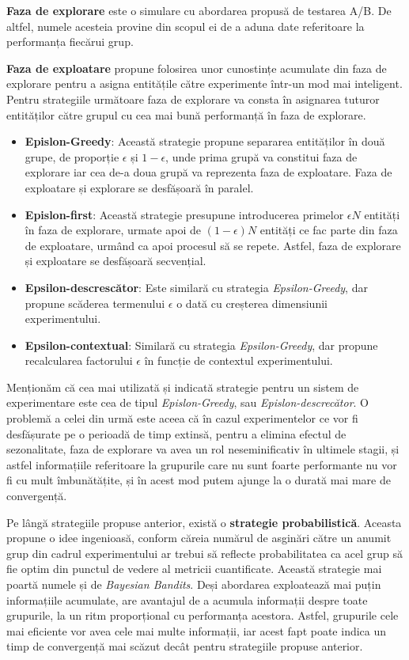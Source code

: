 \textbf{Faza de explorare} este o simulare cu abordarea propusă de testarea A/B. De altfel, numele acesteia provine din scopul ei de a aduna date referitoare la performanța fiecărui grup.

\textbf{Faza de exploatare} propune folosirea unor cunostințe acumulate din faza de explorare pentru a asigna entitățile către experimente într-un mod mai inteligent. Pentru strategiile următoare faza de explorare va consta în asignarea tuturor entităților către grupul cu cea mai bună performanță în faza de explorare.

\begin{itemize}
	\item \textbf{Epislon-Greedy}: Această strategie propune separarea entităților în două grupe, de proporție $\epsilon$ și $1 - \epsilon$, unde prima grupă va constitui faza de explorare iar cea de-a doua grupă va reprezenta faza de exploatare. Faza de exploatare și explorare se desfășoară în paralel.
	\item \textbf{Epislon-first}: Această strategie presupune introducerea primelor $\epsilon N$ entități în faza de explorare, urmate apoi de $(1-\epsilon)N$ entități ce fac parte din faza de exploatare, urmând ca apoi procesul să se repete. Astfel, faza de explorare și exploatare se desfășoară secvențial.
	\item \textbf{Epsilon-descrescător}: Este similară cu strategia \textit{Epsilon-Greedy}, dar propune scăderea termenului $\epsilon$ o dată cu creșterea dimensiunii experimentului.
	\item \textbf{Epsilon-contextual}: Similară cu strategia \textit{Epsilon-Greedy}, dar propune recalcularea factorului $\epsilon$ în funcție de contextul experimentului.
\end{itemize}

Menționăm că cea mai utilizată și indicată strategie pentru un sistem de experimentare este cea de tipul \textit{Epislon-Greedy}, sau \textit{Epislon-descrecător}. O problemă a celei din urmă este aceea că în cazul experimentelor ce vor fi desfășurate pe o perioadă de timp extinsă, pentru a elimina efectul de sezonalitate, faza de explorare va avea un rol neseminificativ în ultimele stagii, și astfel informațiile referitoare la grupurile care nu sunt foarte performante nu vor fi cu mult îmbunătățite, și în acest mod putem ajunge la o durată mai mare de convergență.

Pe lângă strategiile propuse anterior, există o \textbf{strategie probabilistică}. Aceasta propune o idee ingenioasă, conform căreia numărul de asginări către un anumit grup din cadrul experimentului ar trebui să reflecte probabilitatea ca acel grup să fie optim din punctul de vedere al metricii cuantificate. Această strategie mai poartă numele și de \textit{Bayesian Bandits}. Deși abordarea exploatează mai puțin informațiile acumulate, are avantajul de a acumula informații despre toate grupurile, la un ritm proporțional cu performanța acestora. Astfel, grupurile cele mai eficiente vor avea cele mai multe informații, iar acest fapt poate indica un timp de convergență mai scăzut decât pentru strategiile propuse anterior.

